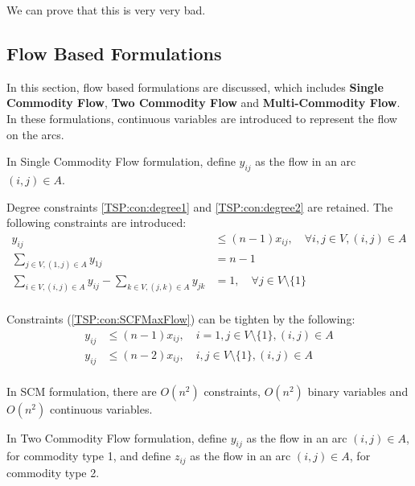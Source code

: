 					We can prove that this is very very bad.

				\subsection{Flow Based Formulations}
					In this section, flow based formulations are discussed, which includes \textbf{Single Commodity Flow}, \textbf{Two Commodity Flow} and \textbf{Multi-Commodity Flow}. In these formulations, continuous variables are introduced to represent the flow on the arcs.

					In Single Commodity Flow formulation, define $y_{ij}$ as the flow in an arc $(i, j) \in A$.

					Degree constraints \ref{TSP:con:degree1} and \ref{TSP:con:degree2} are retained. The following constraints are introduced:
					\begin{align}
						y_{ij} & \le (n - 1) x_{ij}, \quad \forall i, j \in V, (i, j) \in A \label{TSP:con:SCFMaxFlow}\\
						\sum_{j \in V, (1, j) \in A} y_{1j} & = n - 1 \label{TSP:con:SCFInitFlow} \\
						\sum_{i \in V, (i, j) \in A} y_{ij} - \sum_{k \in V, (j, k) \in A} y_{jk} &= 1, \quad \forall j \in V \setminus \{1\} \label{TSP:con:SCFFlowBalance}\\
					\end{align}

					Constraints (\ref{TSP:con:SCFMaxFlow}) can be tighten by the following:
					\begin{align}
						y_{ij} &\le (n - 1) x_{ij}, \quad i = 1, j \in V \setminus \{1\}, (i, j) \in A \label{TSP:con:SCMMaxFlow1} \\
						y_{ij} &\le (n - 2) x_{ij}, \quad i, j \in V \setminus \{1\}, (i, j) \in A \label{TSP:con:SCMMaxFlow2} \\
					\end{align}

					In SCM formulation, there are $O(n^2)$ constraints, $O(n^2)$ binary variables and $O(n^2)$ continuous variables.

					In Two Commodity Flow formulation, define $y_{ij}$ as the flow in an arc $(i, j) \in A$, for commodity type 1, and define $z_{ij}$ as the flow in an arc $(i, j) \in A$, for commodity type 2.

